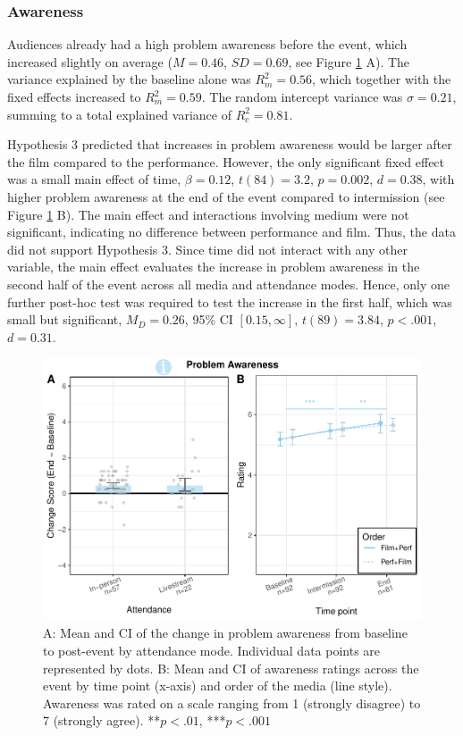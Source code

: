 \documentclass[
  man,floatsintext]{apa6}
\begin{document}
\subsubsection{Awareness}\label{awareness}

Audiences already had a high problem awareness before the event, which increased slightly on average (\(M = 0.46\), \(SD = 0.69\), see Figure \ref{fig:awareness-plots} A). The variance explained by the baseline alone was \(R_{m}^2 = 0.56\), which together with the fixed effects increased to \(R_{m}^2 = 0.59\). The random intercept variance was \(\sigma = 0.21\), summing to a total explained variance of \(R_{c}^2 = 0.81\).

Hypothesis 3 predicted that increases in problem awareness would be larger after the film compared to the performance. However, the only significant fixed effect was a small main effect of time, \(\beta = 0.12\), \(t (84) = 3.2\), \(p = 0.002\), \(d = 0.38\), with higher problem awareness at the end of the event compared to intermission (see Figure \ref{fig:awareness-plots} B). The main effect and interactions involving medium were not significant, indicating no difference between performance and film. Thus, the data did not support Hypothesis 3. Since time did not interact with any other variable, the main effect evaluates the increase in problem awareness in the second half of the event across all media and attendance modes. Hence, only one further post-hoc test was required to test the increase in the first half, which was small but significant, \(M_D = 0.26\), 95\% CI \([0.15, \infty]\), \(t(89) = 3.84\), \(p < .001\), \(d = 0.31\).



\begin{figure}
\includegraphics[width=1\linewidth]{Schlichting_MSc_Thesis_files/figure-latex/awareness-plots-1} \caption{A: Mean and CI of the change in problem awareness from baseline to post-event by attendance mode. Individual data points are represented by dots. B: Mean and CI of awareness ratings across the event by time point (x-axis) and order of the media (line style). Awareness was rated on a scale ranging from 1 (strongly disagree) to 7 (strongly agree). **\(p < .01\), ***\(p < .001\)}\label{fig:awareness-plots}
\end{figure}
\end{document}
